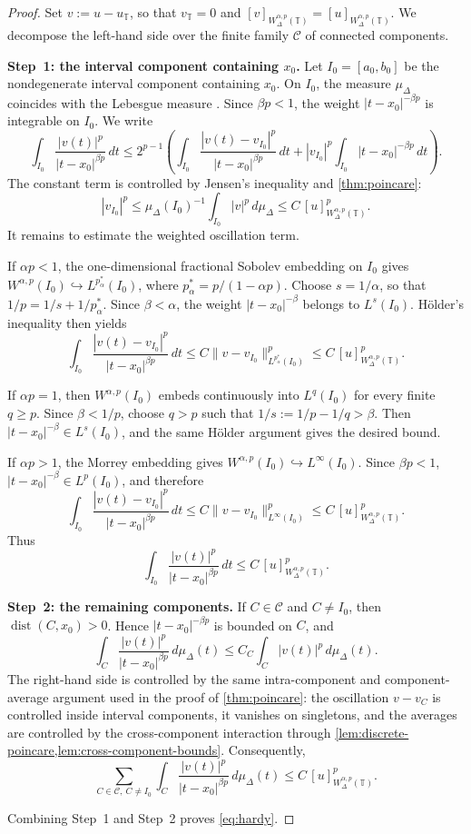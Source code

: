 \documentclass[11pt,a4paper]{article}
\numberwithin{equation}{section}
\theoremstyle{definition}
\newcommand{\T}{\mathbb{T}}
\begin{document}
\begin{proof}
Set $v:=u-u_{\T}$, so that $v_{\T}=0$ and
$[v]_{W^{\alpha,p}_\Delta(\T)}=[u]_{W^{\alpha,p}_\Delta(\T)}$. We decompose
the left-hand side over the finite family $\mathcal C$ of connected components.

\medskip\noindent
\textbf{Step~1: the interval component containing $x_0$.}
Let $I_0=[a_0,b_0]$ be the nondegenerate interval component containing $x_0$.
On $I_0$, the measure $\mu_\Delta$ coincides with the Lebesgue measure
\cite[Theorem~5.2]{CabadaVivero2006}. Since $\beta p<1$, the weight
$|t-x_0|^{-\beta p}$ is integrable on $I_0$. We write
\[
\int_{I_0}\frac{|v(t)|^p}{|t-x_0|^{\beta p}}\,dt
\le 2^{p-1}\left(
\int_{I_0}\frac{|v(t)-v_{I_0}|^p}{|t-x_0|^{\beta p}}\,dt
+ |v_{I_0}|^p\int_{I_0}|t-x_0|^{-\beta p}\,dt
\right).
\]
The constant term is controlled by Jensen's inequality and \cref{thm:poincare}:
\[
|v_{I_0}|^p\le \mu_\Delta(I_0)^{-1}\int_{I_0}|v|^p\,d\mu_\Delta
\le C\,[u]^p_{W^{\alpha,p}_\Delta(\T)}.
\]
It remains to estimate the weighted oscillation term.

If $\alpha p<1$, the one-dimensional fractional Sobolev embedding on $I_0$
gives $W^{\alpha,p}(I_0)\hookrightarrow L^{p_\alpha^*}(I_0)$, where
$p_\alpha^*=p/(1-\alpha p)$. Choose $s=1/\alpha$, so that
$1/p=1/s+1/p_\alpha^*$. Since $\beta<\alpha$, the weight
$|t-x_0|^{-\beta}$ belongs to $L^s(I_0)$. H\"older's inequality then yields
\[
\int_{I_0}\frac{|v(t)-v_{I_0}|^p}{|t-x_0|^{\beta p}}\,dt
\le C\|v-v_{I_0}\|_{L^{p_\alpha^*}(I_0)}^p
\le C\,[u]^p_{W^{\alpha,p}_\Delta(\T)}.
\]

If $\alpha p=1$, then $W^{\alpha,p}(I_0)$ embeds continuously into
$L^q(I_0)$ for every finite $q\ge p$. Since $\beta<1/p$, choose $q>p$ such
that $1/s:=1/p-1/q>\beta$. Then $|t-x_0|^{-\beta}\in L^s(I_0)$, and the same
H\"older argument gives the desired bound.

If $\alpha p>1$, the Morrey embedding gives
$W^{\alpha,p}(I_0)\hookrightarrow L^\infty(I_0)$. Since $\beta p<1$,
$|t-x_0|^{-\beta}\in L^p(I_0)$, and therefore
\[
\int_{I_0}\frac{|v(t)-v_{I_0}|^p}{|t-x_0|^{\beta p}}\,dt
\le C\|v-v_{I_0}\|_{L^\infty(I_0)}^p
\le C\,[u]^p_{W^{\alpha,p}_\Delta(\T)}.
\]
Thus
\[
\int_{I_0}\frac{|v(t)|^p}{|t-x_0|^{\beta p}}\,dt
\le C\,[u]^p_{W^{\alpha,p}_\Delta(\T)}.
\]

\medskip\noindent
\textbf{Step~2: the remaining components.}
If $C\in\mathcal C$ and $C\ne I_0$, then
$\operatorname{dist}(C,x_0)>0$. Hence $|t-x_0|^{-\beta p}$ is bounded on
$C$, and
\[
\int_C\frac{|v(t)|^p}{|t-x_0|^{\beta p}}\,d\mu_\Delta(t)
\le C_C\int_C |v(t)|^p\,d\mu_\Delta(t).
\]
The right-hand side is controlled by the same intra-component and
component-average argument used in the proof of \cref{thm:poincare}: the
oscillation $v-v_C$ is controlled inside interval components, it vanishes on
singletons, and the averages are controlled by the cross-component interaction
through \cref{lem:discrete-poincare,lem:cross-component-bounds}. Consequently,
\[
\sum_{C\in\mathcal C,\ C\ne I_0}
\int_C\frac{|v(t)|^p}{|t-x_0|^{\beta p}}\,d\mu_\Delta(t)
\le C\,[u]^p_{W^{\alpha,p}_\Delta(\T)}.
\]

Combining Step~1 and Step~2 proves \eqref{eq:hardy}.
\end{proof}
\end{document}
